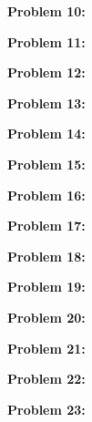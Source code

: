 \documentclass[a4paper,12pt]{article}
\begin{document}
\shunt

{\bf Problem 10:}

\shunt

{\bf Problem 11:}

\shunt

{\bf Problem 12:}

\shunt

{\bf Problem 13:}

\shunt

{\bf Problem 14:}

\shunt

{\bf Problem 15:}

\shunt

{\bf Problem 16:}

\shunt

{\bf Problem 17:}

\shunt

{\bf Problem 18:}

\shunt

{\bf Problem 19:}

\shunt

{\bf Problem 20:}

\shunt

{\bf Problem 21:}

\shunt

{\bf Problem 22:}

\shunt

{\bf Problem 23:}

\shunt
\end{document}
